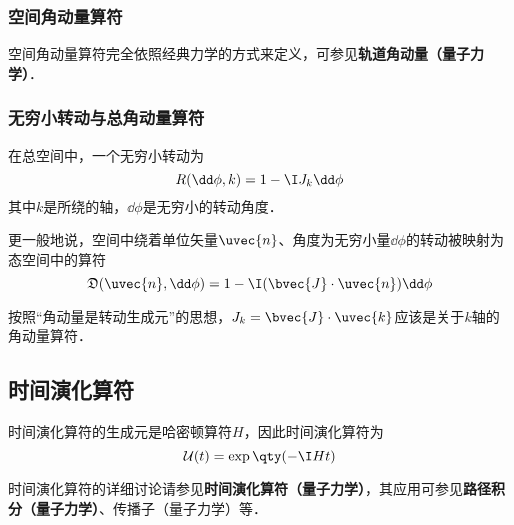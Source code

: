 \subsubsection{空间角动量算符}

空间角动量算符完全依照经典力学的方式来定义，可参见\textbf{轨道角动量（量子力学）}．


\subsubsection{无穷小转动与总角动量算符}


在总空间中，一个无穷小转动为
\begin{equation}
R(\dd \phi, k) = 1-\I J_k\dd \phi
\end{equation}
其中$k$是所绕的轴，$\dd \phi$是无穷小的转动角度．

更一般地说，空间中绕着单位矢量$\uvec{n}$、角度为无穷小量$\dd \phi$的转动被映射为态空间中的算符
\begin{equation}
\mathfrak{D}(\uvec{n}, \dd \phi) = 1-\I(\bvec{J}\cdot\uvec{n})\dd \phi
\end{equation}

按照“角动量是转动生成元”的思想，$J_k=\bvec{J}\cdot \uvec{k}$应该是关于$k$轴的角动量算符．







\subsection{时间演化算符}


时间演化算符的生成元是哈密顿算符$H$，因此时间演化算符为
\begin{equation}
\mathcal{U}(t) = \exp\qty(-\I H t)
\end{equation}

时间演化算符的详细讨论请参见\textbf{时间演化算符（量子力学）}，其应用可参见\textbf{路径积分（量子力学）}、传播子（量子力学）等．


















